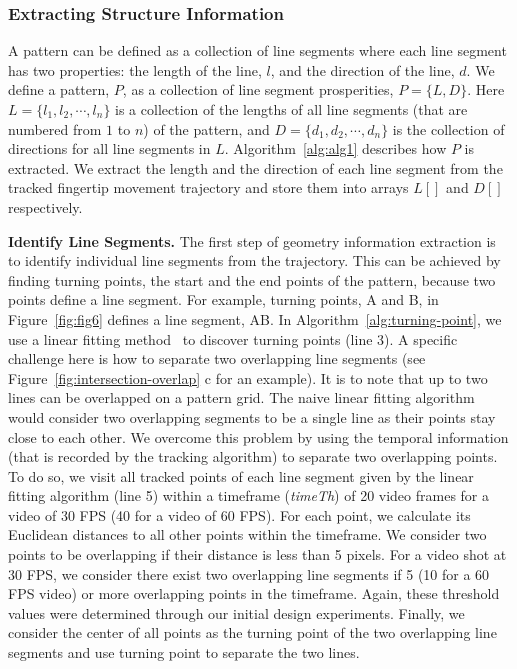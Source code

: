     \subsubsection{Extracting Structure Information}
        A pattern can be defined as a collection of line
        segments where each line segment has two properties:
        the length of the line, $l$, and the direction of the line, $d$.
        We define a
         pattern, $P$, as a collection of line segment prosperities,  $P=\{L, D\}$.
        Here $L=\{l_{1}, l_{2}, \cdots, l_{n}\}$ is a collection of the lengths
        of all line segments (that are numbered from $1$ to $n$) of the pattern, and $D=\{d_{1}, d_{2}, \cdots, d_{n}\}$ is the collection of directions for all line segments in $L$.
        Algorithm~\ref{alg:alg1} describes how $P$ is extracted.
        We extract the length and the direction of each line segment from the tracked fingertip movement trajectory and store them
        into arrays $L[]$ and $D[]$ respectively.

        \noindent \textbf{Identify Line Segments.}
        The first step of geometry information extraction is to identify individual
        line segments from the trajectory. This can be achieved
        by finding turning points, the start and the end points of the pattern, because two points define a line segment. For example, turning points, A and B, in
        Figure~\ref{fig:fig6} defines a line segment, AB. In
        Algorithm~\ref{alg:turning-point}, we use a linear fitting
        method~\cite{Kutner2004Applied} to discover turning points (line 3). A specific
        challenge here is how to separate two overlapping line segments (see
        Figure~\ref{fig:intersection-overlap} c for an example).
        It is to note that up to two lines can be overlapped on a pattern grid.
        The naive
        linear fitting algorithm would consider two overlapping segments to be a
        single line as their points stay close to each other. We overcome this problem
       by using the temporal information (that is recorded by the
        tracking algorithm) to separate two overlapping points.
        To do so, we visit all tracked points of each line segment given by the linear fitting algorithm (line
        5) within a timeframe (\emph{timeTh}) of 20 video frames for a video of 30 FPS (40 for a video of 60 FPS).
        For each point, we calculate its Euclidean distances to all other points within the timeframe.
        We consider two points to be overlapping if their distance is less than 5 pixels.
        For a video shot at 30 FPS, we consider there exist two overlapping line segments if 5 (10 for a 60 FPS video) or more overlapping points in the timeframe.
        Again, these threshold values were determined through our initial design experiments.
        Finally, we consider the center of all points as the turning point of the two overlapping line segments and use turning point to separate the two lines.

